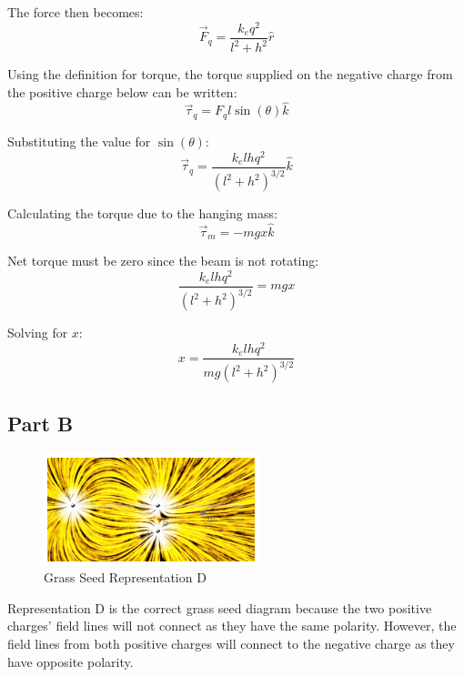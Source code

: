 \documentclass{article}
\begin{document}
The force then becomes:
$$ \vec{F}_{q} = \frac{ k_{e} q^{2} }{ l^{2} + h^{2} } \hat{r} $$

Using the definition for torque, the torque supplied on the negative charge
from the positive charge below can be written:
$$ \vec{\tau}_{q} = F_{q} l \sin(\theta) \hat{k} $$

Substituting the value for $\sin(\theta)$:
$$ \vec{\tau}_{q} = \frac{ k_{e}lhq^{2} }{ \left( l^{2} + h^{2} \right)^{3/2} }
\hat{k}$$

Calculating the torque due to the hanging mass:
$$ \vec{\tau}_{m} = -mgx \hat{k} $$

Net torque must be zero since the beam is not rotating:
$$ \frac{ k_{e}lhq^{2} }{ \left( l^{2} + h^{2} \right)^{3/2} } = mgx $$

Solving for $x$:
$$ x = \frac{ k_{e}lhq^{2} }{ mg \left( l^{2} + h^{2} \right)^{3/2} } $$

\subsection*{Part B}

\begin{figure}[H]
  \centering
  \includegraphics[scale=0.75]{"GrassSeedRepresentationD"}
  \caption{Grass Seed Representation D}
\end{figure}

Representation D is the correct grass seed diagram because the two positive
charges' field lines will not connect as they have the same polarity. However,
the field lines from both positive charges will connect to the negative charge
as they have opposite polarity.
\end{document}
